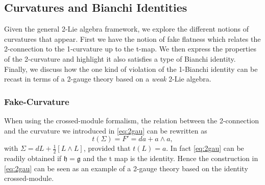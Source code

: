 \documentclass[onecolumn]{article}
\theoremstyle{theorem}
\theoremstyle{remark}
\theoremstyle{example}
\theoremstyle{definition}
\numberwithin{equation}{section}
\def\demi{{\frac{1}{2}}}
\begin{document}


\subsection{Curvatures and Bianchi Identities}\label{2alg}
Given the general 2-Lie algebra framework, we explore the different notions of curvatures that appear. First we have the notion of fake flatness which relates the 2-connection to the 1-curvature up to the t-map. We then express the properties of the 2-curvature and highlight it also satisfies a type of Bianchi identity. Finally, we discuss how the one kind of violation of the 1-Bianchi identity can be recast in terms of a 2-gauge theory based on a \textit{{weak}} 2-Lie algebra.  




\subsubsection{Fake-Curvature}\label{sec:fake-flat}
When using the crossed-module formalism, the relation between the 2-connection and the curvature   we introduced in   \eqref{eq:2gau} can be rewritten  as
\begin{equation} 
t(\Sigma)=F'=da+a\wedge a,     \nonumber
\end{equation}
with  $\Sigma = dL + \demi [L\wedge L]$, provided that  $t(L) =a$. In fact  \eqref{eq:2gau} can be readily obtained if $\mathfrak{h}=\mathfrak{g}$ and the t map is the identity. Hence the construction in \eqref{eq:2gau} can be seen as an example of a 2-gauge theory based on the identity crossed-module. 
\end{document}
